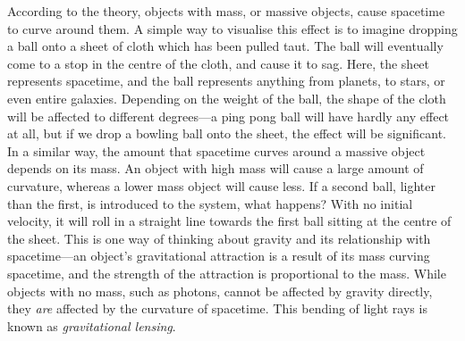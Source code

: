 \documentclass[a4paper,11pt]{article}
\begin{document}
According to the theory, objects with mass, or massive objects, cause spacetime
to curve around them. A simple way to visualise this effect is to imagine
dropping a ball onto a sheet of cloth which has been pulled taut. The ball will
eventually come to a stop in the centre of the cloth, and cause it to sag. Here,
the sheet represents spacetime, and the ball represents anything from planets,
to stars, or even entire galaxies. Depending on the weight of the ball, the
shape of the cloth will be affected to different degrees---a ping pong ball will
have hardly any effect at all, but if we drop a bowling ball onto the sheet, the
effect will be significant. In a similar way, the amount that spacetime curves
around a massive object depends on its mass. An object with high mass will cause
a large amount of curvature, whereas a lower mass object will cause less. If a
second ball, lighter than the first, is introduced to the system, what happens?
With no initial velocity, it will roll in a straight line towards the first ball
sitting at the centre of the sheet. This is one way of thinking about gravity
and its relationship with spacetime---an object's gravitational attraction is a
result of its mass curving spacetime, and the strength of the attraction is
proportional to the mass. While objects with no mass, such as photons, cannot be
affected by gravity directly, they \emph{are} affected by the curvature of
spacetime. This bending of light rays is known as
\emph{gravitational lensing}.
\end{document}
